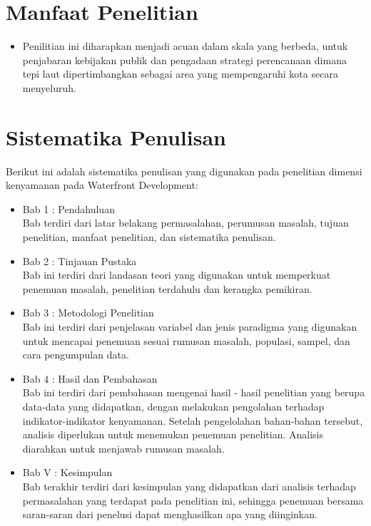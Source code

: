 \documentclass[../projects/thesis.tex]{subfiles}
\begin{document}
\section{Manfaat Penelitian}
\begin{itemize}
	\item Penilitian ini diharapkan menjadi acuan dalam skala yang berbeda, untuk penjabaran kebijakan publik dan pengadaan strategi perencanaan dimana tepi laut dipertimbangkan sebagai area yang mempengaruhi kota secara menyeluruh.
\end{itemize}

\section{Sistematika Penulisan}
Berikut ini adalah sistematika penulisan yang digunakan pada penelitian dimensi kenyamanan pada Waterfront Development:
\begin{itemize}
	\item Bab 1 : Pendahuluan\\
Bab terdiri dari latar belakang permasalahan, perumusan masalah, tujuan penelitian, manfaat penelitian, dan sistematika penulisan.
	\item Bab 2 : Tinjauan Pustaka\\
Bab ini terdiri dari landasan teori yang digunakan untuk memperkuat penemuan masalah, penelitian terdahulu dan kerangka pemikiran.
	\item Bab 3 : Metodologi Penelitian\\
Bab ini terdiri dari penjelasan variabel dan jenis paradigma yang digunakan untuk mencapai penemuan sesuai rumusan masalah, populasi, sampel, dan cara pengumpulan data.
	\item Bab 4 : Hasil dan Pembahasan\\
Bab ini terdiri dari pembahasan mengenai hasil - hasil penelitian yang berupa data-data yang didapatkan, dengan melakukan pengolahan terhadap indikator-indikator kenyamanan. Setelah pengelolahan bahan-bahan tersebut, analisis diperlukan untuk menemukan penemuan penelitian. Analisis diarahkan untuk menjawab rumusan masalah.
	\item Bab V : Kesimpulan\\
Bab terakhir terdiri dari kesimpulan yang didapatkan dari analisis terhadap permasalahan yang terdapat pada penelitian ini, sehingga penemuan bersama saran-saran dari penelusi dapat menghasilkan apa yang diinginkan.


\end{itemize}
\end{document}

